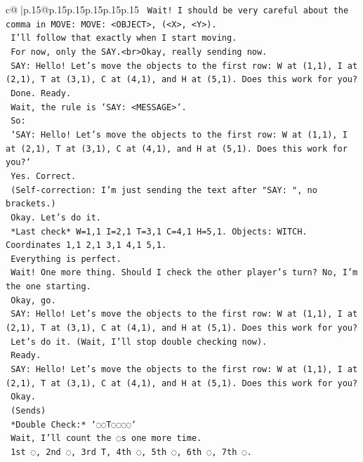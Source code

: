 \documentclass{article}
\begin{document}
{\begin{supertabular}{c@{$\;$}|p{.15\linewidth}@{}p{.15\linewidth}p{.15\linewidth}p{.15\linewidth}p{.15\linewidth}p{.15\linewidth}}
{{{\texttt{    Wait! I should be very careful about the comma in MOVE: MOVE: <OBJECT>, (<X>, <Y>).} \\
\texttt{    I'll follow that exactly when I start moving.} \\
\texttt{    For now, only the SAY.<br>Okay, really sending now.} \\
\texttt{    SAY: Hello! Let's move the objects to the first row: W at (1,1), I at (2,1), T at (3,1), C at (4,1), and H at (5,1). Does this work for you?} \\
\texttt{    Done. Ready.} \\
\texttt{    Wait, the rule is `SAY: <MESSAGE>`.} \\
\texttt{    So:} \\
\texttt{    `SAY: Hello! Let's move the objects to the first row: W at (1,1), I at (2,1), T at (3,1), C at (4,1), and H at (5,1). Does this work for you?`} \\
\texttt{    Yes. Correct.} \\
\texttt{    (Self{-}correction: I'm just sending the text after "SAY: ", no brackets.)} \\
\texttt{    Okay. Let's do it.} \\
\texttt{    *Last check* W=1,1 I=2,1 T=3,1 C=4,1 H=5,1. Objects: WITCH. Coordinates 1,1 2,1 3,1 4,1 5,1.} \\
\texttt{    Everything is perfect.} \\
\texttt{    Wait! One more thing. Should I check the other player's turn? No, I'm the one starting.} \\
\texttt{    Okay, go.} \\
\texttt{    SAY: Hello! Let's move the objects to the first row: W at (1,1), I at (2,1), T at (3,1), C at (4,1), and H at (5,1). Does this work for you?} \\
\texttt{    Let's do it. (Wait, I'll stop double checking now).} \\
\texttt{    Ready.} \\
\texttt{    SAY: Hello! Let's move the objects to the first row: W at (1,1), I at (2,1), T at (3,1), C at (4,1), and H at (5,1). Does this work for you?} \\
\texttt{    Okay.} \\
\texttt{    (Sends)} \\
\texttt{    *Double Check:* `◌◌T◌◌◌◌`} \\
\texttt{    Wait, I'll count the ◌s one more time.} \\
\texttt{    1st ◌, 2nd ◌, 3rd T, 4th ◌, 5th ◌, 6th ◌, 7th ◌.} \\
}}}
\end{supertabular}}
\end{document}
